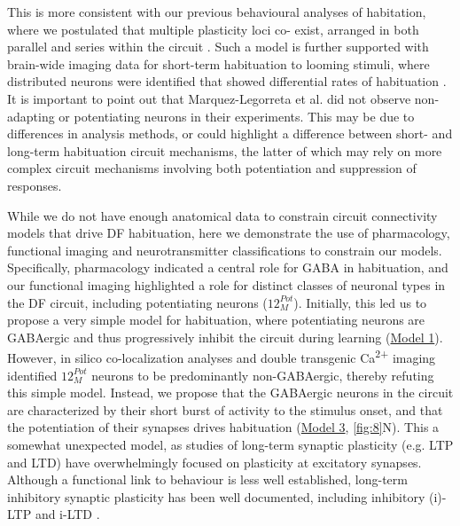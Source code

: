 \documentclass[9pt,lineno]{RandlettLab_elife}
\begin{document}
This is more consistent with our previous behavioural analyses of habitation, where we postulated that multiple plasticity loci co- exist, arranged in both parallel and series within the circuit \cite{Randlett2019-fi}. Such a model is further supported with brain-wide imaging data for short-term habituation to looming stimuli, where distributed neurons were identified that showed differential rates of habituation \cite{Marquez-Legorreta2022-ih}. It is important to point out that Marquez-Legorreta et al. did not observe non-adapting or potentiating neurons in their experiments. This may be due to differences in analysis methods, or could highlight a difference between short- and long-term habituation circuit mechanisms, the latter of which may rely on more complex circuit mechanisms involving both potentiation and suppression of responses. 

While we do not have enough anatomical data to constrain circuit connectivity models that drive DF habituation, here we demonstrate the  use of pharmacology, functional imaging and neurotransmitter classifications to constrain our models. Specifically, pharmacology indicated a central role for GABA in habituation, and our functional imaging highlighted a role for distinct classes of neuronal types in the DF circuit, including potentiating neurons ($12_{M}^{Pot}$). Initially, this led us to propose a very simple model for habituation, where potentiating neurons are GABAergic and thus progressively inhibit the circuit during learning (\underline{Model 1}). However, in silico co-localization analyses and double transgenic Ca\textsuperscript{2+} imaging identified $12_{M}^{Pot}$ neurons to be  predominantly non-GABAergic, thereby refuting this simple model. Instead, we propose that the GABAergic neurons in the circuit are characterized by their short burst of activity to the stimulus onset, and that the potentiation of their synapses drives habituation (\underline{Model 3}, \autoref{fig:8}N). This a somewhat unexpected model, as studies of long-term synaptic plasticity (e.g. LTP and LTD) have overwhelmingly focused on plasticity at excitatory synapses. Although a functional link to behaviour is less well established, long-term inhibitory synaptic plasticity has been well documented, including inhibitory (i)-LTP  and i-LTD \cite{Castillo2011-tq}.
 
\end{document}
